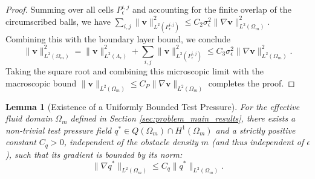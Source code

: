 \documentclass{elsarticle}
\newtheorem{lemma}{Lemma}
\begin{document}
\begin{proof}
    Summing over all cells $P_\epsilon^{i,j}$ and accounting for the finite overlap of the circumscribed balls, we have $\sum_{i,j} \|\mathbf{v}\|_{L^2(P_\epsilon^{i,j})}^2 \le C_2 \sigma_{\epsilon}^2 \|\nabla \mathbf{v}\|_{L^2(\Omega_m)}^2$. Combining this with the boundary layer bound, we conclude
    \begin{equation}
        \|\mathbf{v}\|_{L^2(\Omega_m)}^2 = \|\mathbf{v}\|_{L^2(\Lambda_{\epsilon})}^2 + \sum_{i,j} \|\mathbf{v}\|_{L^2(P_\epsilon^{i,j})}^2 \le C_3 \sigma_{\epsilon}^2 \|\nabla \mathbf{v}\|_{L^2(\Omega_m)}^2.
    \end{equation}
    Taking the square root and combining this microscopic limit with the macroscopic bound $\|\mathbf{v}\|_{L^2(\Omega_m)} \le C_P \|\nabla \mathbf{v}\|_{L^2(\Omega_m)}$ completes the proof.
\end{proof}

\begin{lemma}[Existence of a Uniformly Bounded Test Pressure]\label{lemma:positivity}
    For the effective fluid domain $\Omega_m$ defined in Section \ref{sec:problem_main_results}, there exists a non-trivial test pressure field $q^* \in Q(\Omega_m) \cap H^1(\Omega_m)$ and a strictly positive constant $C_q > 0$, independent of the obstacle density $m$ (and thus independent of $\epsilon$), such that its gradient is bounded by its norm:
    \begin{equation}
        \|\nabla q^*\|_{L^2(\Omega_m)} \le C_q \|q^*\|_{L^2(\Omega_m)}.
    \end{equation}
\end{lemma}
\end{document}
